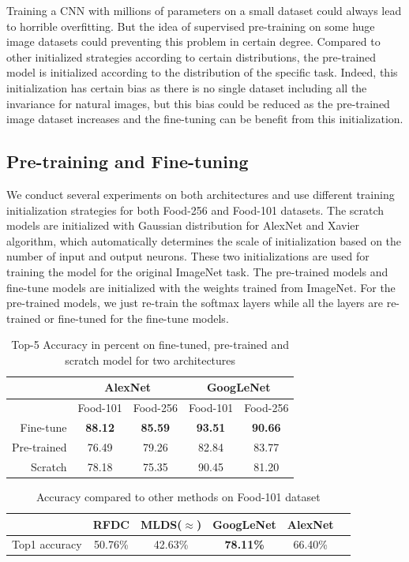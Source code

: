 ﻿Training a CNN with millions of parameters on a small dataset could always lead to horrible overfitting. But the idea of supervised pre-training on some huge image datasets could preventing this problem in certain degree. Compared to other initialized strategies according to certain distributions, the pre-trained model is initialized according to the distribution of the specific task. Indeed, this initialization has certain bias as there is no single dataset including all the invariance for natural images\cite{agrawal2014analyzing}, but this bias could be reduced as the pre-trained image dataset increases and the fine-tuning can be benefit from this initialization.
\subsection{Pre-training and Fine-tuning}
We conduct several experiments on both architectures and use different training initialization strategies for both Food-256 and Food-101 datasets. The scratch models are initialized with Gaussian distribution for AlexNet and Xavier algorithm\cite{glorot2010understanding}, which automatically determines the scale of initialization based on the number of input and output neurons. These two initializations are used for training the model for the original ImageNet task. The pre-trained models and fine-tune models are initialized with the weights trained from ImageNet. For the pre-trained models, we just re-train the softmax layers while all the layers are re-trained or fine-tuned for the fine-tune models.
\begin{table}[htbp]
  \centering
  \caption{Top-5 Accuracy in percent on fine-tuned, pre-trained and scratch model for two architectures}
    \begin{tabular}{r|cc|cc}
    \toprule
          & \multicolumn{2}{c|}{AlexNet} & \multicolumn{2}{c}{GoogLeNet} \\    \midrule
     & Food-101   & Food-256   & Food-101   & Food-256 \\
    Fine-tune & \textbf{88.12} & \textbf{85.59} & \textbf{93.51} & \textbf{90.66} \\
    Pre-trained &76.49	&79.26&	82.84	&83.77\\
    Scratch & 78.18 & 75.35 & 90.45 & 81.20 \\
    \bottomrule
    \end{tabular}%
  \label{tab:ft}%
\end{table}%

\begin{table}[htbp]
  \centering
  \caption{Accuracy compared to other methods on Food-101 dataset}
    \begin{tabular}{c|ccccc}
    \toprule
          & RFDC\cite{bossard14} & MLDS($\approx$\cite{singh2012unsupervised}) & GoogLeNet & AlexNet \\
    \midrule
    Top1 accuracy & 50.76\% & 42.63\%& \textbf{78.11\% }& 66.40\% \\
    \bottomrule
    \end{tabular}%
    \label{tab:pre}
\end{table}%



